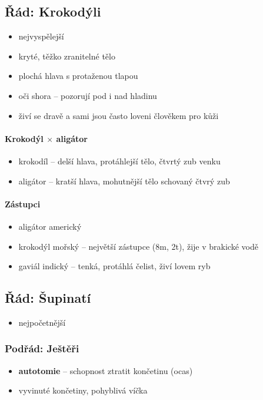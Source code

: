 \subsection{Řád: Krokodýli}
\begin{itemize}
\item nejvyspělejší
\item kryté, těžko zranitelné tělo
\item plochá hlava s protaženou tlapou
\item oči shora -- pozorují pod i nad hladinu
\item živí se dravě a sami jsou často loveni člověkem pro kůži
\end{itemize}

\paragraph{Krokodýl $\times$ aligátor}
\begin{itemize}
\item krokodíl -- delší hlava, protáhlejší tělo, čtvrtý zub venku
\item aligátor -- kratší hlava, mohutnější tělo schovaný čtvrý zub
\end{itemize}

\paragraph{Zástupci}
\begin{itemize}
\item aligátor americký
\item krokodýl mořský -- největší zástupce (8m, 2t), žije v brakické vodě
\item gaviál indický -- tenká, protáhlá čelist, živí lovem ryb
\end{itemize}

\subsection{Řád: Šupinatí}
\begin{itemize}
\item nejpočetnější
\end{itemize}

\subsubsection{Podřád: Ještěři}
\begin{itemize}
\item \textbf{autotomie} -- schopnost ztratit končetinu (ocas)
\item vyvinuté končetiny, pohyblivá víčka
\end{itemize}

